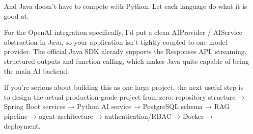 And Java doesn't have to compete with Python. Let each language do what it is good at.

For the OpenAI integration specifically, I'd put a clean AIProvider / AIService abstraction in Java, so your application isn't tightly coupled to one model provider. The official Java SDK already supports the Responses API, streaming, structured outputs and function calling, which makes Java quite capable of being the main AI backend.

If you're serious about building this as one large project, the next useful step is to design the actual production-grade project from zero: repository structure → Spring Boot services → Python AI service → PostgreSQL schema → RAG pipeline → agent architecture → authentication/RBAC → Docker → deployment.


